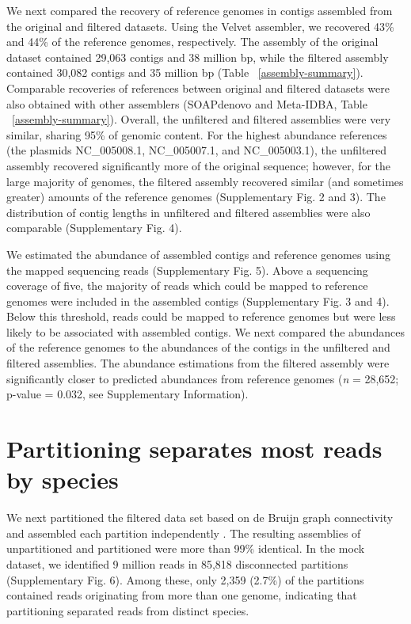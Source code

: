 \documentclass{nature}%
\begin{document}
We next compared the recovery of reference genomes in contigs
assembled from the original and filtered datasets.  Using the Velvet
assembler, we recovered 43\% and 44\% of the reference genomes, respectively.  The
assembly of the original dataset contained 29,063 contigs and 38
million bp, while the filtered assembly contained 30,082 contigs and
35 million bp (Table ~\ref{assembly-summary}).  Comparable recoveries
of references between original and filtered datasets were also
obtained with other assemblers (SOAPdenovo and Meta-IDBA, 
Table ~\ref{assembly-summary}).  Overall,
the unfiltered and filtered assemblies were very similar, sharing 95\%
of genomic content.  For the highest abundance references
(the plasmids NC\_005008.1, NC\_005007.1, and
NC\_005003.1), the unfiltered assembly recovered
significantly more of the original sequence; however, for the large
majority of genomes, the filtered assembly recovered similar (and
sometimes greater) amounts of the reference genomes (Supplementary Fig. 2 and
3).  The distribution of contig lengths in unfiltered and filtered
assemblies were also comparable (Supplementary Fig. 4).

We estimated the abundance of assembled contigs and reference genomes
using the mapped sequencing reads (Supplementary Fig. 5).  Above a
sequencing coverage of five, the majority of reads which could be
mapped to reference genomes were included in the assembled contigs
(Supplementary Fig. 3 and 4).  Below this threshold, reads could be mapped to
reference genomes but were less likely to be associated with assembled
contigs.  We next compared the abundances of the reference genomes to
the abundances of the contigs in the unfiltered and filtered
assemblies.  The abundance estimations from the filtered assembly were
significantly closer to predicted abundances from reference genomes
(\emph{n} = 28,652; p-value = 0.032, see Supplementary Information).

\section*{Partitioning separates most reads by species}

We next partitioned the filtered data set based on de Bruijn graph
connectivity and assembled each partition independently
\cite{howeartifacts, Pell:2012cq}. The resulting assemblies of
unpartitioned and partitioned were more than 99\% identical.  In the
mock dataset, we identified 9 million reads in 85,818 disconnected
partitions (Supplementary Fig. 6).  Among these, only 2,359 (2.7\%) of the
partitions contained reads originating from more than one genome,
indicating that partitioning separated reads from distinct
species.
\end{document}
